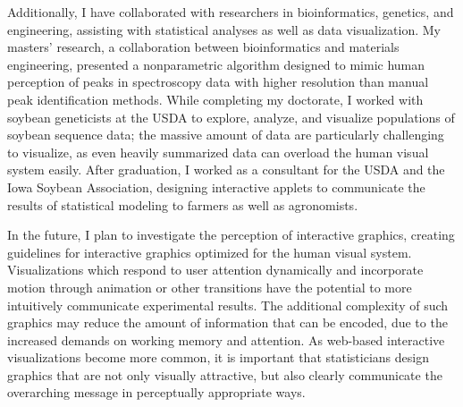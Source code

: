 \documentclass[12pt, letterpaper, sans]{moderncv}
\begin{document}
Additionally, I have collaborated with researchers in bioinformatics, genetics, and engineering, assisting with statistical analyses as well as data visualization. My masters' research, a collaboration between bioinformatics and materials engineering, presented a nonparametric algorithm designed to mimic human perception of peaks in spectroscopy data with higher resolution than manual peak identification methods. While completing my doctorate, I worked with soybean geneticists at the USDA to explore, analyze, and visualize populations of soybean sequence data; the massive amount of data are particularly challenging to visualize, as even heavily summarized data can overload the human visual system easily. After graduation, I worked as a consultant for the USDA and the Iowa Soybean Association, designing interactive applets to communicate the results of statistical modeling to farmers as well as agronomists. 

In the future, I plan to investigate the perception of interactive graphics, creating guidelines for interactive graphics optimized for the human visual system. Visualizations which respond to user attention dynamically and incorporate motion through animation or other transitions have the potential to more intuitively communicate experimental results. The additional complexity of such graphics may reduce the amount of information that can be encoded, due to the increased demands on working memory and attention. As web-based interactive visualizations become more common, it is important that statisticians design graphics that are not only visually attractive, but also clearly communicate the overarching message in perceptually appropriate ways.

\end{document}
